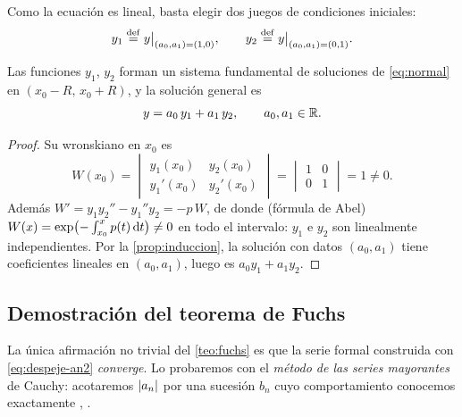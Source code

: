 Como la ecuación es lineal, basta elegir dos juegos de condiciones
iniciales:
\begin{equation}\label{eq:y1y2}
  y_1\mathrel{\overset{\mathrm{def}}{=}} y\big|_{(a_0,a_1)=(1,0)},\qquad
  y_2\mathrel{\overset{\mathrm{def}}{=}} y\big|_{(a_0,a_1)=(0,1)}.
\end{equation}

\begin{proposicion}\label{prop:fundamental}
Las funciones $y_1$, $y_2$ forman un sistema fundamental de soluciones de
\eqref{eq:normal} en $(x_0-R,\,x_0+R)$, y la solución general es
\begin{equation}\label{eq:general}
  y=a_0\,y_1+a_1\,y_2,\qquad a_0,a_1\in\mathbb{R} .
\end{equation}
\end{proposicion}

\begin{proof}
Su wronskiano en $x_0$ es
\begin{equation}\label{eq:wronskiano}
  W(x_0)=\begin{vmatrix} y_1(x_0) & y_2(x_0)\\ y_1'(x_0) & y_2'(x_0)\end{vmatrix}
  =\begin{vmatrix}1&0\\0&1\end{vmatrix}=1\neq0 .
\end{equation}
Además $W'=y_1y_2''-y_1''y_2=-p\,W$, de donde (fórmula de Abel)
$W(x)=\exp\bigl(-\int_{x_0}^{x}p(t)\,\mathrm{d} t\bigr)\neq0$ en todo el
intervalo: $y_1$ e $y_2$ son linealmente independientes. Por la
\cref{prop:induccion}, la solución con datos $(a_0,a_1)$ tiene coeficientes
lineales en $(a_0,a_1)$, luego es $a_0y_1+a_1y_2$.
\end{proof}

\subsection{Demostración del teorema de Fuchs}\label{sec:demo-fuchs}
La única afirmación no trivial del \cref{teo:fuchs} es que la serie formal
construida con \eqref{eq:despeje-an2} \emph{converge}. Lo probaremos con el
\emph{método de las series mayorantes} de Cauchy: acotaremos $\lvert a_n\rvert$ por
una sucesión $b_n$ cuyo comportamiento conocemos exactamente
\cite[cap.~3]{CODDINGTON}, \cite[§4.1]{TESCHL}.

